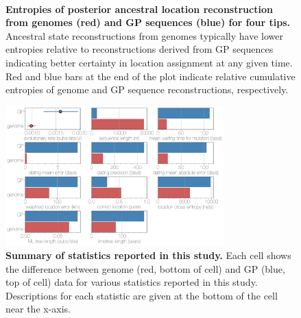 \documentclass[11pt,oneside,letterpaper]{article}
\begin{document}
\begin{figure}[h]
 \centering
  \\
  \caption{\textbf{Entropies of posterior ancestral location reconstruction from genomes (red) and GP sequences (blue) for four tips.}
  Ancestral state reconstructions from genomes typically have lower entropies relative to reconstructions derived from GP sequences indicating better certainty in location assignment at any given time.
  Red and blue bars at the end of the plot indicate relative cumulative entropies of genome and GP sequence reconstructions, respectively.
  }
	\label{trace_entropy}
\end{figure}

\begin{figure}[h]
 \centering
	\includegraphics[width=0.75\textwidth]{supp_figures/sfig8_summary.png}
	\caption{\textbf{Summary of statistics reported in this study.}
  Each cell shows the difference between genome (red, bottom of cell) and GP (blue, top of cell) data for various statistics reported in this study.
  Descriptions for each statistic are given at the bottom of the cell near the x-axis.
	}
	\label{summary}
\end{figure}
\end{document}
